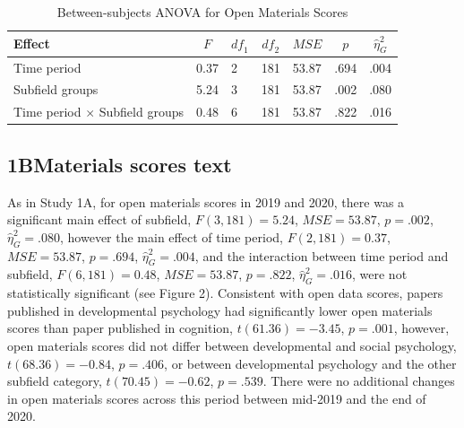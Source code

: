 \documentclass[
  english,
  man]{apa6}
\begin{document}
\begin{table}[tbp]

\begin{center}
\begin{threeparttable}

\caption{\label{tab:1B-m-anova}Between-subjects ANOVA for Open Materials Scores}

\begin{tabular}{lllllll}
\toprule
Effect & \multicolumn{1}{c}{$F$} & \multicolumn{1}{c}{$\mathit{df}_1$} & \multicolumn{1}{c}{$\mathit{df}_2$} & \multicolumn{1}{c}{$\mathit{MSE}$} & \multicolumn{1}{c}{$p$} & \multicolumn{1}{c}{$\hat{\eta}^2_G$}\\
\midrule
Time period & 0.37 & 2 & 181 & 53.87 & .694 & .004\\
Subfield groups & 5.24 & 3 & 181 & 53.87 & .002 & .080\\
Time period $\times$ Subfield groups & 0.48 & 6 & 181 & 53.87 & .822 & .016\\
\bottomrule
\end{tabular}

\end{threeparttable}
\end{center}

\end{table}

\hypertarget{bmaterials-scores-text}{%
\subsection{1BMaterials scores text}\label{bmaterials-scores-text}}

As in Study 1A, for open materials scores in 2019 and 2020, there was a significant main effect of subfield, \(F(3, 181) = 5.24\), \(\mathit{MSE} = 53.87\), \(p = .002\), \(\hat{\eta}^2_G = .080\), however the main effect of time period, \(F(2, 181) = 0.37\), \(\mathit{MSE} = 53.87\), \(p = .694\), \(\hat{\eta}^2_G = .004\), and the interaction between time period and subfield, \(F(6, 181) = 0.48\), \(\mathit{MSE} = 53.87\), \(p = .822\), \(\hat{\eta}^2_G = .016\), were not statistically significant (see Figure 2). Consistent with open data scores, papers published in developmental psychology had significantly lower open materials scores than paper published in cognition, \(t(61.36) = -3.45\), \(p = .001\), however, open materials scores did not differ between developmental and social psychology, \(t(68.36) = -0.84\), \(p = .406\), or between developmental psychology and the other subfield category, \(t(70.45) = -0.62\), \(p = .539\). There were no additional changes in open materials scores across this period between mid-2019 and the end of 2020.
\end{document}
